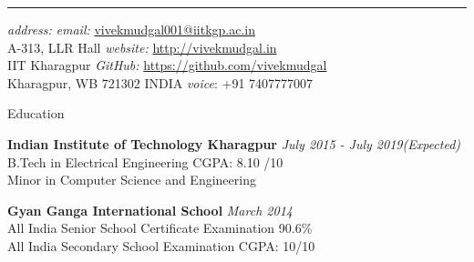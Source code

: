 \documentclass{resume} %
\begin{document}
\hrule
\vspace{0.5 em}
{\em address:} \hfill {\textit{ email:} \href{mailto:vivekmudgal001@iitkgp.ac.in}{vivekmudgal001@iitkgp.ac.in} }\\
A-313, LLR Hall \hfill {\textit{ website:} \href{http://vivekmudgal.in}{http://vivekmudgal.in}} \\ 
IIT Kharagpur \hfill {\textit{GitHub:} \href{https://github.com/vivekmudgal}{https://github.com/vivekmudgal}} \\
Kharagpur, WB 721302 INDIA	\hfill {\textit{voice}: +91 7407777007} \\



\begin{rSection}{Education}

{\bf Indian Institute of Technology Kharagpur} \hfill {\em July 2015 - July 2019(Expected)} 
\\ B.Tech in Electrical Engineering \hfill { CGPA: 8.10 /10}
\\ Minor in Computer Science and Engineering


\vspace{0.5 em}

{\bf Gyan Ganga International School} \hfill {\em March 2014}
\\ All India Senior School Certificate Examination \hfill {90.6\%}
\\ All India Secondary School Examination \hfill {CGPA: 10/10}



\end{rSection}



\end{document}
